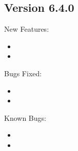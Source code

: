 \subsection{\label{sec:New-6-4-0}Version 6.4.0}
\noindent New Features:
\begin{itemize}

\item 

\item 

\end{itemize}

\noindent Bugs Fixed:
\begin{itemize}

\item 

\item 

\end{itemize}

\noindent Known Bugs:
\begin{itemize}
\item 

\item 

\end{itemize}


